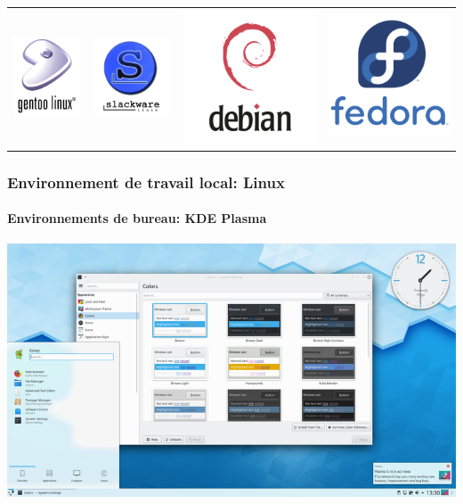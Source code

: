 \documentclass[xcolor=table]{beamer}
\begin{document}
\begin{frame}
\begin{tabular}{llll}
	\includegraphics[width=.2\textwidth]{..//img/Bweb01-environnement/gentoo-logo.png} & 
	\includegraphics[width=.2\textwidth]{..//img/Bweb01-environnement/slackware-logo.png} &
	\includegraphics[width=.2\textwidth]{..//img/Bweb01-environnement/debian-logo.png} & 
	\includegraphics[width=.2\textwidth]{..//img/Bweb01-environnement/fedora-logo.png} \\
	
\end{tabular}

\end{frame}

\begin{frame}
\frametitle{Environnement de travail local: Linux}
\framesubtitle{Environnements de bureau: KDE Plasma}

\begin{center}
	\includegraphics[height=
.8\textheight]{../img/Bweb01-environnement/kde.png}
\end{center}

\end{frame}
\end{document}
